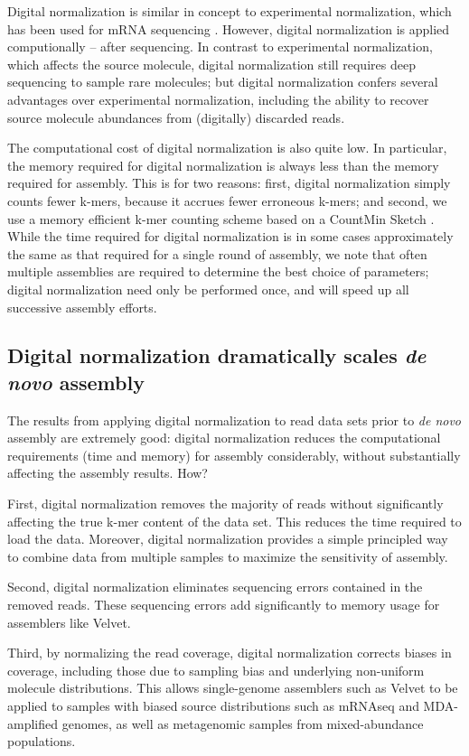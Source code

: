 \documentclass[10pt]{article}
\begin{document}
Digital normalization is similar in concept to experimental
normalization, which has been used for mRNA sequencing
\cite{pubmed8889548,pubmed7937745}. However, digital normalization is
applied computionally -- after sequencing.  In contrast to
experimental normalization, which affects the source molecule, digital
normalization still requires deep sequencing to sample rare molecules;
but digital normalization confers several advantages over
experimental normalization, including the ability to recover source
molecule abundances from (digitally) discarded reads.

The computational cost of digital normalization is also quite low.  In
particular, the memory required for digital normalization is always
less than the memory required for assembly.  This is for two reasons:
first, digital normalization simply counts fewer k-mers, because it
accrues fewer erroneous k-mers; and second,
we use a memory efficient k-mer counting scheme based on a CountMin
Sketch \cite{CountMinSketch}.  While the time required for digital normalization is in some
cases approximately the same as that required for a single round of
assembly, we note that often multiple assemblies are required to
determine the best choice of parameters; digital normalization
need only be performed once, and will speed up all successive assembly
efforts.

\subsection*{Digital normalization dramatically scales {\em de novo} assembly}

The results from applying digital normalization to read data sets
prior to {\em de novo} assembly are extremely good: digital normalization
reduces the computational requirements (time and memory) for assembly
considerably, without substantially affecting the assembly results.
How?

First, digital normalization removes the majority of
reads without significantly affecting the true k-mer content of
the data set.  This reduces the time required to load the data.
Moreover, digital normalization provides a simple principled way to
combine data from multiple samples to maximize the sensitivity of
assembly.

Second, digital normalization eliminates sequencing errors contained in
the removed reads.  These sequencing errors add significantly to memory
usage for assemblers like Velvet.

Third, by normalizing the read coverage, digital normalization
corrects biases in coverage, including those due to sampling bias and
underlying non-uniform molecule distributions.  This allows
single-genome assemblers such as Velvet to be applied to
samples with biased source distributions such as mRNAseq and
MDA-amplified genomes, as well as metagenomic samples from
mixed-abundance populations.
\end{document}
